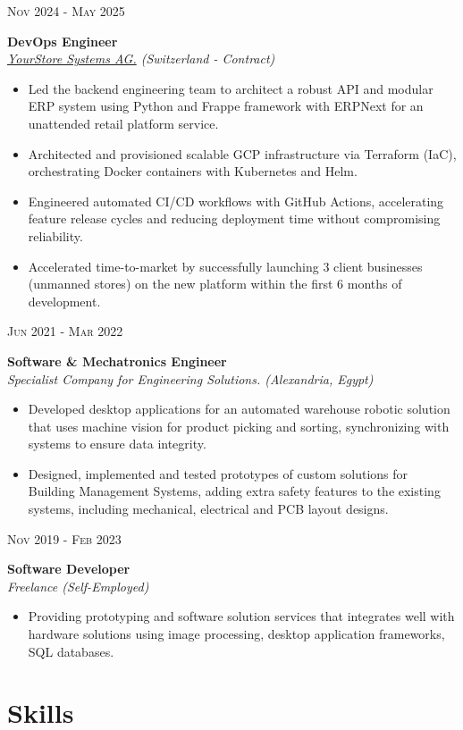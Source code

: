 \documentclass[a4paper]{article}
\newcommand{\entry}[4]{   %
	\begin{center}
		\begin{minipage}[c]{0.2\linewidth}  %
			\vfill
			\hfill  %
			\textsc{#1}  %
			\vfill
		\end{minipage}
		\hfill\vline\hfill  %
		\begin{minipage}[c]{0.75\linewidth}
            \textrm{\bfseries{#2}} \\
			\textit{#3} \\
			\footnotesize{#4}
		\end{minipage}
	\end{center}
}
\newcommand{\blist}[1]{  %
    \vspace{-\topsep}
    \renewcommand\labelitemi{\tiny$\bullet$}
    \begin{itemize}[leftmargin=3.5mm, noitemsep]
        #1
    \end{itemize}
}
\begin{document}
        \entry{Nov 2024 - May 2025}
            {DevOps Engineer}
            {\href{https://yourstore.ch/}{YourStore Systems AG.} (Switzerland - Contract)}
            {
                \blist{
                    \item Led the backend engineering team to architect a robust API and modular ERP system using Python and
                        Frappe framework with ERPNext for an unattended retail platform service.
                    \item Architected and provisioned scalable GCP infrastructure via Terraform (IaC), orchestrating Docker containers with Kubernetes and Helm.
                    \item Engineered automated CI/CD workflows with GitHub Actions, accelerating feature release cycles and reducing deployment time
                        without compromising reliability.
                    \item Accelerated time-to-market by successfully launching 3 client businesses (unmanned stores) on the new platform
                        within the first 6 months of development.
                }
            }
        \entry{Jun 2021 - Mar 2022}
            {Software \& Mechatronics Engineer}
            {Specialist Company for Engineering Solutions. (Alexandria, Egypt)}
            {
                \blist{
                    \item Developed desktop applications for an automated warehouse robotic solution that uses machine vision for product picking and sorting,
                        synchronizing with systems to ensure data integrity.
                    \item Designed, implemented and tested prototypes of custom solutions for Building Management Systems,
                        adding extra safety features to the existing systems, including mechanical, electrical and PCB layout designs.
                }
            }
        \entry{Nov 2019 - Feb 2023}
            {Software Developer}
            {Freelance (Self-Employed)}
            {
                \blist{
                    \item Providing prototyping and software solution services that integrates well with hardware solutions using image processing,
                        desktop application frameworks, SQL databases.
                }
            }

	\section{Skills}
\end{document}
